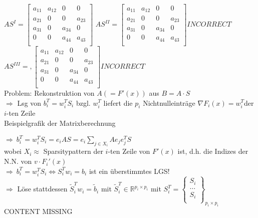 $AS^I =
\begin{bmatrix}
 a_{11}	& a_{12}& 0		& 0 \\
 a_{21}	& 0		& 0		& a_{23}\\
 a_{31}	& 0		& a_{34}& 0\\
 0		& 0		& a_{44}& a_{43}\\
\end{bmatrix}$
$AS^{II}=
\begin{bmatrix}
a_{11}	& a_{12}& 0		& 0 \\
a_{21}	& 0		& 0		& a_{23}\\
a_{31}	& 0		& a_{34}& 0\\
0		& 0		& a_{44}& a_{43}\\
\end{bmatrix} INCORRECT$
$AS^{III}=,
\begin{bmatrix}
a_{11}	& a_{12}& 0		& 0 \\
a_{21}	& 0		& 0		& a_{23}\\
a_{31}	& 0		& a_{34}& 0\\
0		& 0		& a_{44}& a_{43}\\
\end{bmatrix}INCORRECT$\\

\noindent
Problem: Rekonstruktion von $A (=F'(x))$ aus $B=A\cdot S$\\
$\Rightarrow$ Lsg von $b_i^T = w_i^TS_i$ bzgl. $w_i^T$ liefert die $p_i$ Nichtnulleinträge $\nabla F_i(x)=w_i^T$der $i$-ten Zeile\\
Beispielgrafik der Matrixberechnung\\
\noindent

$\Rightarrow\ b_i^T =w_i^TS_i = e_i A S = e_i \sum_{j \in X_i} Ae_je_j^TS$\\
wobei  $X_i \approx$ Sparsitypattern der $i$-ten Zeile von $F'(x)$ ist, d.h. die Indizes der N.N. von $v\cdot F_i'(x)$\\
$\Rightarrow\ b_i^T =w_i^TS_i \Leftrightarrow S_i^Tw_i = b_i$ ist ein überstimmtes LGS!\\

$\Rightarrow$ Löse stattdessen $\tilde{S}_i^Tw_i = \tilde{b}_i$ mit $\tilde{S}^T_i \in \mathbb{R}^{p_i\times p_i}$ mit $S_i^T = \begin{Bmatrix}
S_i\\
\dots \\
S_i \\
\end{Bmatrix}_{p_i \times p_i}$\\
CONTENT MISSING


